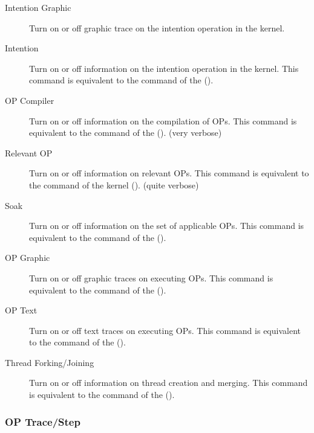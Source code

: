 \begin{description}
\item[Intention Graphic] Turn on or off graphic trace on the
intention operation in the kernel.

\item[Intention] Turn on or off information on the intention
operation in the kernel. This command is equivalent to the  command of the \CPK{} ().

\item[OP Compiler] Turn on or off information on the compilation of
OPs. This command is equivalent to the  command of
the \CPK{} (). (very verbose)

\item[Relevant OP] Turn on or off information on relevant OPs. This
command is equivalent to the  command of the \COPRS{}
kernel (). (quite verbose)

\item[Soak] Turn on or off information on the set of applicable OPs.
This command is equivalent to the  command of
the \CPK{} ().

\item[OP Graphic] Turn on or off graphic traces on executing OPs. This command
is equivalent to the  command of 
the \CPK{} ().


\item[OP Text] Turn on or off text traces on executing OPs. This command
is equivalent to the  command of 
the \CPK{} ().

\item[Thread Forking/Joining] Turn on or off information on thread creation and
merging. This command is equivalent to the  command of the
\CPK{} ().

\end{description}

\subsubsection{OP Trace/Step}



